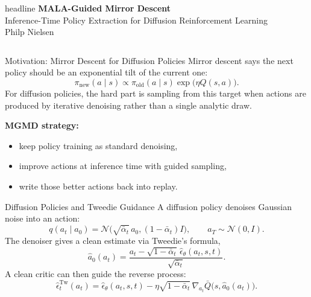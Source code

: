 \documentclass[final,hyperref={pdfpagelabels=false}]{beamer}
\newlength{\colwidth}
\begin{document}
\begin{frame}[t]
\begin{beamercolorbox}[wd=\paperwidth,ht=10cm]{headline}
\vspace{1cm}
\centering
{\fontsize{72}{80}\selectfont\bfseries MALA-Guided Mirror Descent}\\[0.8cm]
{\fontsize{40}{48}\selectfont Inference-Time Policy Extraction for Diffusion Reinforcement Learning}\\[1cm]
{\fontsize{34}{40}\selectfont Philp Nielsen}\\[0.5cm]
\end{beamercolorbox}
\vspace{1cm}
\begin{columns}[t]
\begin{column}{\colwidth}
\begin{block}{\Large Motivation: Mirror Descent for Diffusion Policies}
\small
Mirror descent says the next policy should be an exponential tilt of the current one:
\[
\pi_{\mathrm{new}}(a\mid s)\propto \pi_{\mathrm{old}}(a\mid s)\exp\!\bigl(\eta Q(s,a)\bigr).
\]
For diffusion policies, the hard part is sampling from this target when actions are produced by iterative denoising rather than a single analytic draw.

\vspace{0.3em}
\textbf{MGMD strategy:}
\begin{itemize}
  \item keep policy training as standard denoising,
  \item improve actions at inference time with guided sampling,
  \item write those better actions back into replay.
\end{itemize}
\end{block}

\vspace{0.8cm}

\begin{block}{\Large Diffusion Policies and Tweedie Guidance}
\small
A diffusion policy denoises Gaussian noise into an action:
\[
q(a_t\mid a_0)=\mathcal{N}\!\bigl(\sqrt{\bar\alpha_t}\,a_0,(1-\bar\alpha_t)I\bigr),
\qquad a_T\sim\mathcal{N}(0,I).
\]
The denoiser gives a clean estimate via Tweedie's formula,
\[
\hat a_0(a_t)=\frac{a_t-\sqrt{1-\bar\alpha_t}\,\hat\epsilon_\theta(a_t,s,t)}{\sqrt{\bar\alpha_t}}.
\]
A clean critic can then guide the reverse process:
\[
\hat\epsilon_t^{\mathrm{Tw}}(a_t)=\hat\epsilon_\theta(a_t,s,t)-\eta\sqrt{1-\bar\alpha_t}\,\nabla_{a_t}\bar Q\!\bigl(s,\hat a_0(a_t)\bigr).
\]


\end{block}
\end{column}
\end{columns}
\end{frame}
\end{document}
